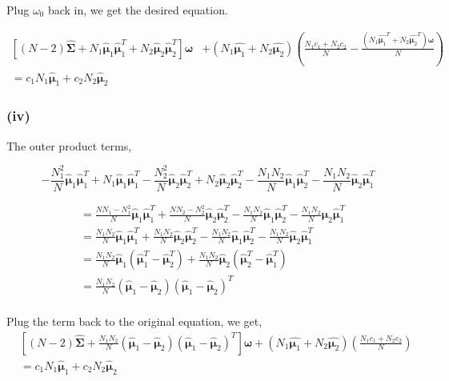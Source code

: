 \documentclass[11pt]{article}
\begin{document}
Plug $\omega_0$ back in, we get the desired equation.

\begin{equation}
\begin{split}
\left[(N-2)\hat{\pmb{\Sigma}}+N_1\hat{\pmb{\mu}}_1\hat{\pmb{\mu}}_1^T+N_2\hat{\pmb{\mu}}_2\hat{\pmb{\mu}}_2^T\right]\pmb{\omega}&+\left(N_1\hat{\pmb{\mu}_1}+N_2\hat{\pmb{\mu}_2}\right)\left(\frac{N_1c_1+N_2c_2}{N}-\frac{\left(N_1\hat{\pmb{\mu}_1}^T+N_2\hat{\pmb{\mu}_2}^T\right)\pmb{\omega}}{N}\right)\\
=c_1N_1\hat{\pmb{\mu}}_1+c_2N_2\hat{\pmb{\mu}}_2
\end{split}
\end{equation}

\subsubsection*{(iv)}
The outer product terms,

$$-\frac{N_1^2}{N}\hat{\pmb{\mu}}_1\hat{\pmb{\mu}}_1^T+N_1\hat{\pmb{\mu}}_1\hat{\pmb{\mu}}_1^T
-\frac{N_2^2}{N}\hat{\pmb{\mu}}_2\hat{\pmb{\mu}}_2^T+N_2\hat{\pmb{\mu}}_2\hat{\pmb{\mu}}_2^T
-\frac{N_1N_2}{N}\hat{\pmb{\mu}}_1\hat{\pmb{\mu}}_2^T
-\frac{N_1N_2}{N}\hat{\pmb{\mu}}_2\hat{\pmb{\mu}}_1^T$$

\begin{equation}
\begin{split}
&=\frac{NN_1-N_1^2}{N}\hat{\pmb{\mu}}_1\hat{\pmb{\mu}}_1^T
+\frac{NN_2-N_2^2}{N}\hat{\pmb{\mu}}_2\hat{\pmb{\mu}}_2^T
-\frac{N_1N_2}{N}\hat{\pmb{\mu}}_1\hat{\pmb{\mu}}_2^T
-\frac{N_1N_2}{N}\hat{\pmb{\mu}}_2\hat{\pmb{\mu}}_1^T\\
&=\frac{N_1N_2}{N}\hat{\pmb{\mu}}_1\hat{\pmb{\mu}}_1^T
+\frac{N_1N_2}{N}\hat{\pmb{\mu}}_2\hat{\pmb{\mu}}_2^T
-\frac{N_1N_2}{N}\hat{\pmb{\mu}}_1\hat{\pmb{\mu}}_2^T
-\frac{N_1N_2}{N}\hat{\pmb{\mu}}_2\hat{\pmb{\mu}}_1^T\\
&=\frac{N_1N_2}{N}\hat{\pmb{\mu}}_1\left(\hat{\pmb{\mu}}_1^T-\hat{\pmb{\mu}}_2^T\right)
+\frac{N_1N_2}{N}\hat{\pmb{\mu}}_2\left(\hat{\pmb{\mu}}_2^T-\hat{\pmb{\mu}}_1^T\right)\\
&=\frac{N_1N_2}{N}\left(\hat{\pmb{\mu}}_1-\hat{\pmb{\mu}}_2\right)\left(\hat{\pmb{\mu}}_1-\hat{\pmb{\mu}}_2\right)^T\\
\end{split}
\end{equation}

Plug the term back to the original equation, we get,
\begin{equation}
\begin{split}
&\left[(N-2)\hat{\pmb{\Sigma}} +\frac{N_1N_2}{N}\left(\hat{\pmb{\mu}}_1-\hat{\pmb{\mu}}_2\right)\left(\hat{\pmb{\mu}}_1-\hat{\pmb{\mu}}_2\right)^T\right]\pmb{\omega}+\left(N_1\hat{\pmb{\mu}_1}+N_2\hat{\pmb{\mu}_2}\right)\left(\frac{N_1c_1+N_2c_2}{N}\right)\\
&=c_1N_1\hat{\pmb{\mu}}_1+c_2N_2\hat{\pmb{\mu}}_2
\end{split}
\end{equation}
\end{document}
